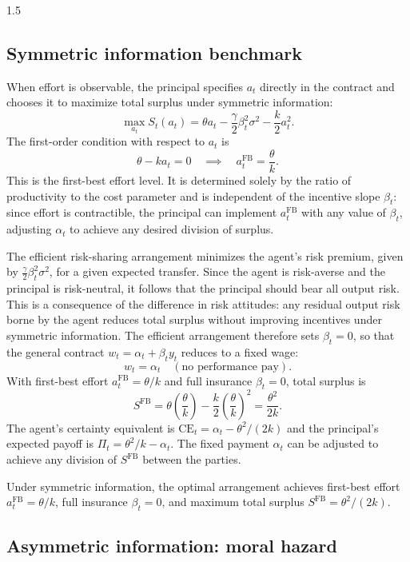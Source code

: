 \documentclass[12pt]{article}
\theoremstyle{definition}
\theoremstyle{plain}
\begin{document}
\begin{spacing}{1.5}
\subsection{Symmetric information benchmark}\label{subsec:symmetric}

When effort is observable, the principal specifies $a_t$ directly in the contract and chooses it to maximize total surplus under symmetric information:
\[
\max_{a_t} S_t(a_t) = \theta a_t - \frac{\gamma}{2}\beta_t^2 \sigma^2 - \frac{k}{2}a_t^2.
\]
The first-order condition with respect to $a_t$ is
\[
\theta - k a_t = 0 \quad \implies \quad a_t^{\text{FB}} = \frac{\theta}{k}.
\]
This is the first-best effort level. It is determined solely by the ratio of productivity to the cost parameter and is independent of the incentive slope $\beta_t$: since effort is contractible, the principal can implement $a_t^{\text{FB}}$ with any value of $\beta_t$, adjusting $\alpha_t$ to achieve any desired division of surplus.

The efficient risk-sharing arrangement minimizes the agent's risk premium, given by $\frac{\gamma}{2}\beta_t^2\sigma^2$, for a given expected transfer. Since the agent is risk-averse and the principal is risk-neutral, it follows that the principal should bear all output risk. This is a consequence of the difference in risk attitudes: any residual output risk borne by the agent reduces total surplus without improving incentives under symmetric information. The efficient arrangement therefore sets $\beta_t = 0$, so that the general contract $w_t = \alpha_t + \beta_t y_t$ reduces to a fixed wage:
\[
w_t = \alpha_t \quad (\text{no performance pay}).
\]
With first-best effort $a_t^{\text{FB}} = \theta/k$ and full insurance $\beta_t = 0$, total surplus is
\[
S^{\text{FB}} = \theta \left(\frac{\theta}{k}\right) - \frac{k}{2}\left(\frac{\theta}{k}\right)^2 = \frac{\theta^2}{2k}.
\]
The agent's certainty equivalent is $\text{CE}_t = \alpha_t - \theta^2/(2k)$ and the principal's expected payoff is $\Pi_t = \theta^2/k - \alpha_t$. The fixed payment $\alpha_t$ can be adjusted to achieve any division of $S^{\text{FB}}$ between the parties.

Under symmetric information, the optimal arrangement achieves first-best effort $a_t^{\text{FB}} = \theta/k$, full insurance $\beta_t = 0$, and maximum total surplus $S^{\text{FB}} = \theta^2/(2k)$.

\subsection{Asymmetric information: moral hazard}\label{subsec:moral_hazard}


\end{spacing}
\end{document}

